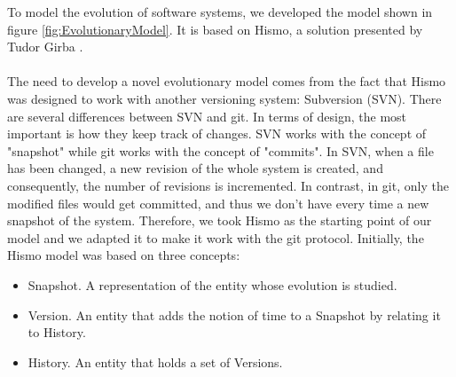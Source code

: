 To model the evolution of software systems, we developed the model 
shown in figure \ref{fig:EvolutionaryModel}. It is based on Hismo, a solution presented by Tudor Girba \cite{Girba2005}.\\
\\
The need to develop a novel evolutionary model comes from the fact that Hismo was designed to work with another versioning system: Subversion (SVN). 
There are several differences between SVN and git. In terms of design, the most important is how they keep track of changes. 
SVN works with the concept of "snapshot" while git works with the concept of "commits".
In SVN, when a file has been changed, a new revision of the whole system is created, and consequently, the number of revisions is incremented. 
In contrast, in git, only the modified files would get committed, and thus we don't have every time a new snapshot of the system. 
Therefore, we took Hismo as the starting point of our model and we adapted it to make it work with the git protocol. 
Initially, the Hismo model was based on three concepts:
\begin{itemize}
    \item Snapshot. A representation of the entity whose evolution is studied.
    \item Version. An entity that adds the notion of time to a Snapshot by relating it to History. 
    \item History. An entity that holds a set of Versions.
\end{itemize}


